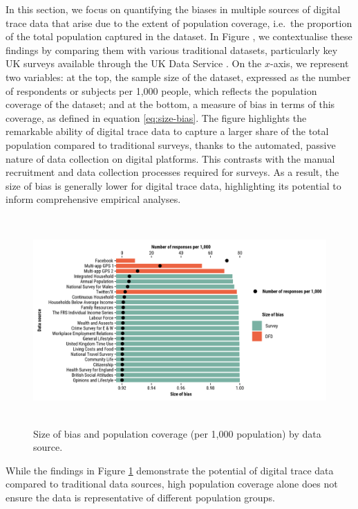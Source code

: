 \documentclass[]{rsos}%
\begin{document}
In this section, we focus on quantifying the biases in multiple sources
of digital trace data that arise due to the extent of population
coverage, i.e.~the proportion of the total population captured in the
dataset. In Figure , we contextualise these findings by comparing them
with various traditional datasets, particularly key UK surveys available
through the UK Data Service \citep{ukdataserviceSurveysData}. On the
\(x\)-axis, we represent two variables: at the top, the sample size of the
dataset, expressed as the number of respondents or subjects per 1,000
people, which reflects the population coverage of the dataset; and at
the bottom, a measure of bias in terms of this coverage, as defined in
equation \ref{eq:size-bias}. The figure highlights the remarkable
ability of digital trace data to capture a larger share of the total
population compared to traditional surveys, thanks to the automated,
passive nature of data collection on digital platforms. This contrasts
with the manual recruitment and data collection processes required for
surveys. As a result, the size of bias is generally lower for digital
trace data, highlighting its potential to inform comprehensive empirical
analyses.

\begin{figure}
\hypertarget{fig:survey}{%
\centering
\includegraphics[width=5.20833in,height=3.125in]{figures/compare-surveys-legend.png}
\caption{Size of bias and population coverage (per 1,000 population) by data
source.}\label{fig:survey}
}
\end{figure}

While the findings in Figure \ref{fig:survey} demonstrate the potential
of digital trace data compared to traditional data sources, high
population coverage alone does not ensure the data is representative of
different population groups.
\end{document}
